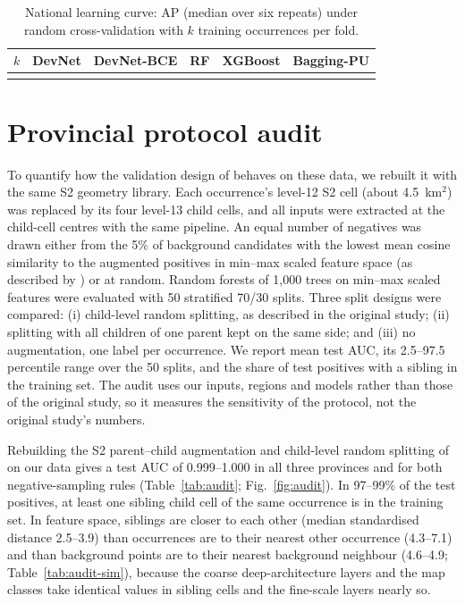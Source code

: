 \documentclass[pdflatex,sn-apa]{sn-jnl}
\begin{document}
\begin{appendices}
\begin{table}[!h]
\caption{National learning curve: AP (median over six repeats) under random cross-validation with $k$ training occurrences per fold.}\label{tab:nat-curve}
\footnotesize
\begin{tabular*}{0.8\textwidth}{@{\extracolsep\fill}lccccc}
\toprule
$k$ & DevNet & DevNet-BCE & RF & XGBoost & Bagging-PU \\
\midrule
\botrule
\end{tabular*}
\end{table}

\clearpage
\section{Provincial protocol audit}\label{app:audit}\label{sec:res-audit}

To quantify how the validation design of \citet{Parsa2024} behaves on these data, we rebuilt it with the same S2 geometry library. Each occurrence's level-12 S2 cell (about 4.5~km$^2$) was replaced by its four level-13 child cells, and all inputs were extracted at the child-cell centres with the same pipeline. An equal number of negatives was drawn either from the 5\% of background candidates with the lowest mean cosine similarity to the augmented positives in min--max scaled feature space (as described by \citealp{Parsa2024}) or at random. Random forests of 1,000 trees on min--max scaled features were evaluated with 50 stratified 70/30 splits. Three split designs were compared: (i) child-level random splitting, as described in the original study; (ii) splitting with all children of one parent kept on the same side; and (iii) no augmentation, one label per occurrence. We report mean test AUC, its 2.5--97.5 percentile range over the 50 splits, and the share of test positives with a sibling in the training set. The audit uses our inputs, regions and models rather than those of the original study, so it measures the sensitivity of the protocol, not the original study's numbers.


Rebuilding the S2 parent--child augmentation and child-level random splitting of \citet{Parsa2024} on our data gives a test AUC of 0.999--1.000 in all three provinces and for both negative-sampling rules (Table~\ref{tab:audit}; Fig.~\ref{fig:audit}). In 97--99\% of the test positives, at least one sibling child cell of the same occurrence is in the training set. In feature space, siblings are closer to each other (median standardised distance 2.5--3.9) than occurrences are to their nearest other occurrence (4.3--7.1) and than background points are to their nearest background neighbour (4.6--4.9; Table~\ref{tab:audit-sim}), because the coarse deep-architecture layers and the map classes take identical values in sibling cells and the fine-scale layers nearly so.


\end{appendices}
\end{document}
